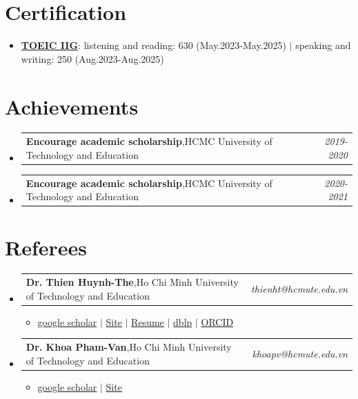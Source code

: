 \documentclass[a4paper,11pt]{article}
\makeatletter
\newcommand{\resumeItem}[2]{
  \item{
    \textbf{#1}{:\hspace{0.5mm}#2 \vspace{-0.5mm}}
  }
}
\newcommand{\resumePOR}[3]{
\vspace{0.5mm}\item
    \begin{tabular*}{0.97\textwidth}[t]{l@{\extracolsep{\fill}}r}
        \textbf{#1},\hspace{0.3mm}#2 & \textit{\small{#3}} 
    \end{tabular*}
    \vspace{-2mm}
}
\newcommand{\resumeSubItem}[2]{\resumeItem{#1}{#2}\vspace{-4pt}}
\newcommand{\resumeSubHeadingListStart}{\begin{itemize}[leftmargin=*,labelsep=0mm]}
\newcommand{\resumeHeadingSkillStart}{\begin{itemize}[leftmargin=*,itemsep=1.7mm, rightmargin=2ex]}
\newcommand{\resumeItemListStart}{\begin{justify}\begin{itemize}[leftmargin=3ex, rightmargin=2ex, noitemsep,labelsep=1.2mm,itemsep=0mm]\small}
\newcommand{\resumeSubHeadingListEnd}{\end{itemize}\vspace{4mm}}
\newcommand{\resumeHeadingSkillEnd}{\end{itemize}\vspace{-4mm}}
\newcommand{\resumeItemListEnd}{\end{itemize}\end{justify}\vspace{-2mm}}
\makeatother
\begin{document}
\section{Certification}
\resumeHeadingSkillStart
 \resumeSubItem{\href{https://github.com/Winxkin/Data_huan.nguyen-duy/tree/master/Toeic}{TOEIC IIG}} %
    { listening and reading: 630 (May.2023-May.2025) $|$ speaking and writing: 250 (Aug.2023-Aug.2025)}
 \resumeHeadingSkillEnd


\section{Achievements}
\vspace{-0.2mm}
\resumeSubHeadingListStart
\resumePOR{Encourage academic scholarship} %
    {HCMC University of Technology and Education} %
    {2019-2020} %
\resumePOR{Encourage academic scholarship} %
    {HCMC University of Technology and Education} %
    {2020-2021} %
\resumeSubHeadingListEnd
\vspace{-2mm}



\section{Referees}
\vspace{-0.6mm}
\resumeSubHeadingListStart
\resumePOR{Dr. Thien Huynh-The} %
    {Ho Chi Minh University of Technology and Education} %
    {thienht@hcmute.edu.vn}
    \resumeItemListStart
      \item {\href{https://scholar.google.com/citations?user=_MLGtqEAAAAJ&;fbclid=IwAR08QAZBO_b35fdm1bM8v0fHEfl3-qivwMlnEFMarkt81gryNO2xrK8cubM}{google scholar}
          $|$ \href{https://sites.google.com/site/thienhuynhthe/home}{Site}
          $|$ \href{https://drive.google.com/file/d/1bVDb_Pw2yzkDWXj63IQiVxTfyNXbOE96/view}{Resume}
          $|$ \href{https://dblp.uni-trier.de/pid/153/6644.html}{dblp}
          $|$ \href{https://orcid.org/0000-0002-9172-2935}{ORCID} }
    \resumeItemListEnd
\resumePOR{Dr. Khoa Pham-Van}
    {Ho Chi Minh University of Technology and Education}
    {khoapv@hcmute.edu.vn}
    \resumeItemListStart
    \item
    {\href{https://scholar.google.co.kr/citations?user=t_abZ6kAAAAJ&;hl=en}{google scholar}
      $|$ \href{https://sites.google.com/site/khoaphamhcmute/}{Site} }
    \resumeItemListEnd
\resumeSubHeadingListEnd
\vspace{-6mm}


\end{document}
